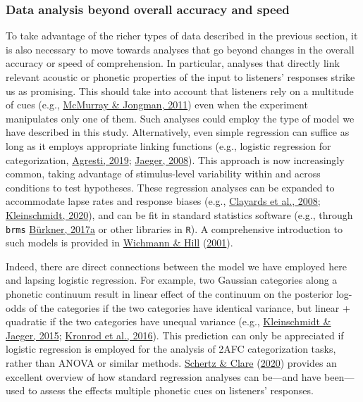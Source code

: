 \documentclass[
  11pt,
  english,
  man,floatsintext]{apa6}
\begin{document}
\hypertarget{data-analysis-beyond-overall-accuracy-and-speed}{%
\subsubsection{Data analysis beyond overall accuracy and speed}\label{data-analysis-beyond-overall-accuracy-and-speed}}

To take advantage of the richer types of data described in the previous section, it is also necessary to move towards analyses that go beyond changes in the overall accuracy or speed of comprehension. In particular, analyses that directly link relevant acoustic or phonetic properties of the input to listeners' responses strike us as promising. This should take into account that listeners rely on a multitude of cues (e.g., \protect\hyperlink{ref-mcmurray-jongman2011}{McMurray \& Jongman, 2011}) even when the experiment manipulates only one of them. Such analyses could employ the type of model we have described in this study. Alternatively, even simple regression can suffice as long as it employs appropriate linking functions (e.g., logistic regression for categorization, \protect\hyperlink{ref-agresti2019}{Agresti, 2019}; \protect\hyperlink{ref-jaeger2008}{Jaeger, 2008}). This approach is now increasingly common, taking advantage of stimulus-level variability within and across conditions to test hypotheses. These regression analyses can be expanded to accommodate lapse rates and response biases (e.g., \protect\hyperlink{ref-clayards2008}{Clayards et al., 2008}; \protect\hyperlink{ref-kleinschmidt2020}{Kleinschmidt, 2020}), and can be fit in standard statistics software (e.g., through \texttt{brms} \protect\hyperlink{ref-burkner2017}{Bürkner, 2017a} or other libraries in \texttt{R}). A comprehensive introduction to such models is provided in \protect\hyperlink{ref-wichmann-hill2001}{Wichmann \& Hill} (\protect\hyperlink{ref-wichmann-hill2001}{2001}).

Indeed, there are direct connections between the model we have employed here and lapsing logistic regression. For example, two Gaussian categories along a phonetic continuum result in linear effect of the continuum on the posterior log-odds of the categories if the two categories have identical variance, but linear + quadratic if the two categories have unequal variance (e.g., \protect\hyperlink{ref-kleinschmidt-jaeger2015}{Kleinschmidt \& Jaeger, 2015}; \protect\hyperlink{ref-kronrod2016}{Kronrod et al., 2016}). This prediction can only be appreciated if logistic regression is employed for the analysis of 2AFC categorization tasks, rather than ANOVA or similar methods. \protect\hyperlink{ref-schertz-clare2020}{Schertz \& Clare} (\protect\hyperlink{ref-schertz-clare2020}{2020}) provides an excellent overview of how standard regression analyses can be---and have been---used to assess the effects multiple phonetic cues on listeners' responses.
\end{document}
